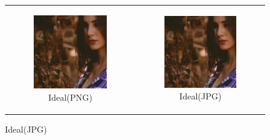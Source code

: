 \noindent
\begin{figure}
  \centering
  \begin{tabular}{cc}
    \begin{subfigure}{0.3\textwidth}
      \includegraphics[width=\linewidth]{inc/research/formats/original_png.png}
      \caption{Ideal(PNG)}
    \end{subfigure} &
    \begin{subfigure}{0.3\textwidth}
      \includegraphics[width=\linewidth]{inc/research/formats/original_jpg.png}
      \caption{Ideal(JPG)}
    \end{subfigure} \\
    

\end{tabular}
\end{figure}
